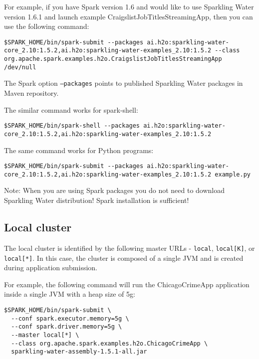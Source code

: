 For example, if you have Spark version 1.6 and would like to use Sparkling Water version 1.6.1 and launch example CraigslistJobTitlesStreamingApp, then you can use the following command:

\begin{lstlisting}[style=Bash]
$SPARK_HOME/bin/spark-submit --packages ai.h2o:sparkling-water-core_2.10:1.5.2,ai.h2o:sparkling-water-examples_2.10:1.5.2 --class org.apache.spark.examples.h2o.CraigslistJobTitlesStreamingApp /dev/null
\end{lstlisting}

The Spark option \texttt{--packages} points to published Sparkling Water packages in Maven repository.

The similar command works for spark-shell:

\begin{lstlisting}[style=Bash]
$SPARK_HOME/bin/spark-shell --packages ai.h2o:sparkling-water-core_2.10:1.5.2,ai.h2o:sparkling-water-examples_2.10:1.5.2 
\end{lstlisting}

The same command works for Python programs:

\begin{lstlisting}[style=Bash]
$SPARK_HOME/bin/spark-submit --packages ai.h2o:sparkling-water-core_2.10:1.5.2,ai.h2o:sparkling-water-examples_2.10:1.5.2 example.py
\end{lstlisting}

    Note: When you are using Spark packages you do not need to download Sparkling Water distribution! Spark installation is sufficient!


\subsection{Local cluster}
The local cluster is identified by the following master URLs - \texttt{local}, \texttt{local[K]}, or \texttt{local[*]}. In this case, the cluster is composed of a single JVM and is created during application submission.

For example, the following command will run the ChicagoCrimeApp application inside a single JVM with a heap size of 5g:
\begin{lstlisting}[style=Bash]
$SPARK_HOME/bin/spark-submit \ 
  --conf spark.executor.memory=5g \
  --conf spark.driver.memory=5g \
  --master local[*] \
  --class org.apache.spark.examples.h2o.ChicagoCrimeApp \
  sparkling-water-assembly-1.5.1-all.jar  
\end{lstlisting}


